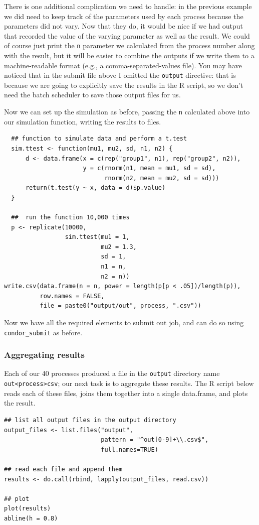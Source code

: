 \documentclass[11pt]{article}
\begin{document}
There is one additional complication we need to handle: in the previous example we did need to keep track of the parameters used by each process because the parameters did not vary. Now that they do, it would be nice if we had output that recorded the value of the varying parameter as well as the result. We could of course just print the \texttt{n} parameter we calculated from the process number along with the result, but it will be easier to combine the outputs if we write them to a machine-readable format (e.g., a comma-separated-values file). You may have noticed that in the submit file above I omitted the \texttt{output} directive: that is because we are going to explicitly save the results in the R script, so we don't need the batch scheduler to save those output files for us.

Now we can set up the simulation as before, passing the \texttt{n} calculated above into our simulation function, writing the results to files. 
\begin{verbatim}
  ## function to simulate data and perform a t.test
  sim.ttest <- function(mu1, mu2, sd, n1, n2) {
      d <- data.frame(x = c(rep("group1", n1), rep("group2", n2)),
                      y = c(rnorm(n1, mean = mu1, sd = sd),
                            rnorm(n2, mean = mu2, sd = sd)))
      return(t.test(y ~ x, data = d)$p.value)
  }

  ##  run the function 10,000 times 
  p <- replicate(10000,
                 sim.ttest(mu1 = 1,
                           mu2 = 1.3,
                           sd = 1,
                           n1 = n,
                           n2 = n))
write.csv(data.frame(n = n, power = length(p[p < .05])/length(p)),
          row.names = FALSE,
          file = paste0("output/out", process, ".csv"))
\end{verbatim}

Now we have all the required elements to submit out job, and can do so using \texttt{condor\_submit} as before. 

\subsubsection{Aggregating results}
\label{sec-7-4-3}
Each of our 40 processes produced a file in the \texttt{output} directory name \texttt{out<process>csv}; our next task is to aggregate these results. The R script below reads each of these files, joins them together into a single data.frame, and plots the result.
\begin{verbatim}
## list all output files in the output directory
output_files <- list.files("output",
                           pattern = "^out[0-9]+\\.csv$",
                           full.names=TRUE)

## read each file and append them
results <- do.call(rbind, lapply(output_files, read.csv))

## plot
plot(results)
abline(h = 0.8)
\end{verbatim}
\end{document}
